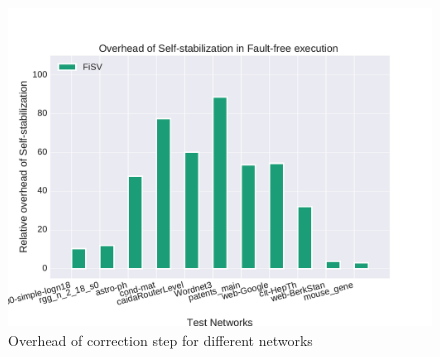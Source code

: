 \begin{figure}
\includegraphics[width=0.95\columnwidth]{plots/timetest}\caption{Overhead of correction step for different networks}
\end{figure}

